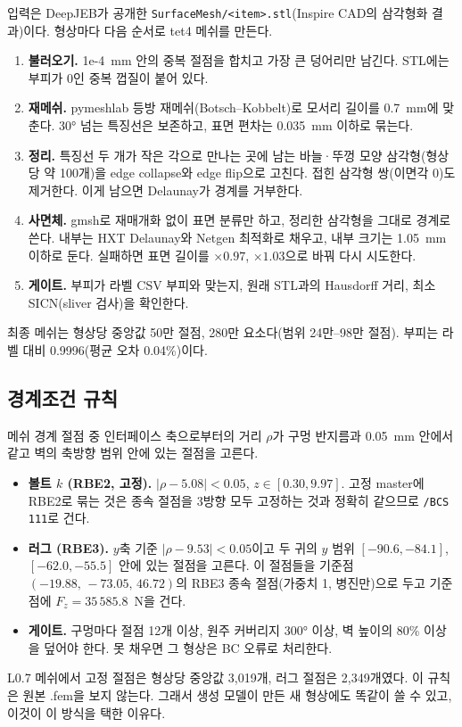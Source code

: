 \documentclass[11pt]{article}
\begin{document}
입력은 DeepJEB가 공개한 \texttt{SurfaceMesh/<item>.stl}(Inspire CAD의
삼각형화 결과)이다. 형상마다 다음 순서로 tet4 메쉬를 만든다.
\begin{enumerate}
\item \textbf{불러오기.} 1e-4~mm 안의 중복 절점을 합치고 가장 큰 덩어리만 남긴다.
      STL에는 부피가 0인 중복 껍질이 붙어 있다.
\item \textbf{재메쉬.} pymeshlab 등방 재메쉬(Botsch--Kobbelt)로 모서리 길이를
      0.7~mm에 맞춘다. 30° 넘는 특징선은 보존하고, 표면 편차는 0.035~mm 이하로 묶는다.
\item \textbf{정리.} 특징선 두 개가 작은 각으로 만나는 곳에 남는 바늘·뚜껑
      모양 삼각형(형상당 약 100개)을 edge collapse와 edge flip으로 고친다.
      접힌 삼각형 쌍(이면각 0)도 제거한다. 이게 남으면 Delaunay가 경계를 거부한다.
\item \textbf{사면체.} gmsh로 재매개화 없이 표면 분류만 하고, 정리한 삼각형을 그대로
      경계로 쓴다. 내부는 HXT Delaunay와 Netgen 최적화로 채우고, 내부 크기는
      1.05~mm 이하로 둔다. 실패하면 표면 길이를 $\times0.97$, $\times1.03$으로 바꿔
      다시 시도한다.
\item \textbf{게이트.} 부피가 라벨 CSV 부피와 맞는지, 원래 STL과의 Hausdorff
      거리, 최소 SICN(sliver 검사)을 확인한다.
\end{enumerate}
최종 메쉬는 형상당 중앙값 50만 절점, 280만 요소다(범위 24만--98만 절점).
부피는 라벨 대비 0.9996(평균 오차 0.04\%)이다.

\subsection{경계조건 규칙}

메쉬 경계 절점 중 인터페이스 축으로부터의 거리 $\rho$가 구멍 반지름과
0.05~mm 안에서 같고 벽의 축방향 범위 안에 있는 절점을 고른다.
\begin{itemize}
\item \textbf{볼트 $k$ (RBE2, 고정).} $|\rho-5.08|<0.05$, $z\in[0.30, 9.97]$.
      고정 master에 RBE2로 묶는 것은 종속 절점을 3방향 모두 고정하는 것과
      정확히 같으므로 \texttt{/BCS 111}로 건다.
\item \textbf{러그 (RBE3).} $y$축 기준 $|\rho-9.53|<0.05$이고 두 귀의 $y$ 범위
      $[-90.6,-84.1]$, $[-62.0,-55.5]$ 안에 있는 절점을 고른다. 이 절점들을
      기준점 $(-19.88,\,-73.05,\,46.72)$의 RBE3 종속 절점(가중치 1, 병진만)으로
      두고 기준점에 $F_z=35\,585.8$~N을 건다.
\item \textbf{게이트.} 구멍마다 절점 12개 이상, 원주 커버리지 300° 이상, 벽 높이의
      80\% 이상을 덮어야 한다. 못 채우면 그 형상은 BC 오류로 처리한다.
\end{itemize}
L0.7 메쉬에서 고정 절점은 형상당 중앙값 3,019개, 러그 절점은 2,349개였다.
이 규칙은 원본 .fem을 보지 않는다. 그래서 생성 모델이 만든 새 형상에도 똑같이
쓸 수 있고, 이것이 이 방식을 택한 이유다.
\end{document}
